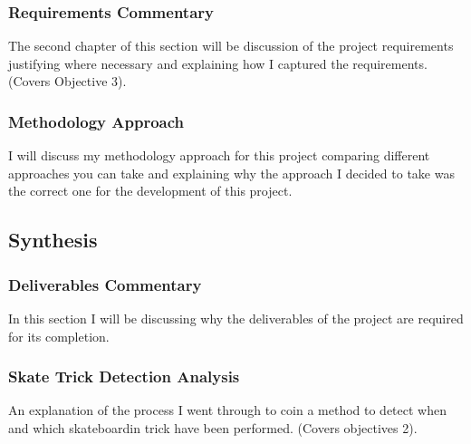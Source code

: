 \subsubsection{Requirements Commentary}\label{tor:rptrequirments}
The second chapter of this section will be discussion of the project requirements justifying where necessary and explaining how I captured the requirements. (Covers Objective 3).
\subsubsection{Methodology Approach}\label{for:rptmethodologyapproach}
I will discuss my methodology approach for this project comparing different approaches you can take and explaining why the approach I decided to take was the correct one for the development of this project.
\subsection{Synthesis}\label{tor:rptsynthesis}
\subsubsection{Deliverables Commentary}\label{tor:rptdeliverables}
In this section I will be discussing why the deliverables of the project are required for its completion.
\subsubsection{Skate Trick Detection Analysis}\label{tor:rptskateanalysis}
An explanation of the process I went through to coin a method to detect when and which skateboardin trick have been performed. (Covers objectives 2).




